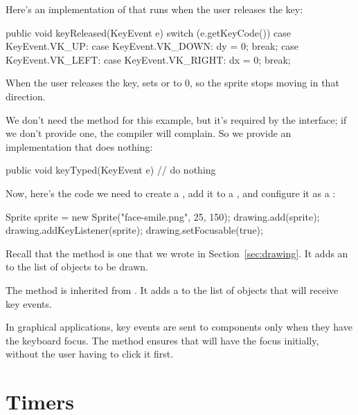 Here's an implementation of  that runs when the user releases the key:

\begin{code}
public void keyReleased(KeyEvent e) {
    switch (e.getKeyCode()) {
        case KeyEvent.VK_UP:
        case KeyEvent.VK_DOWN:
            dy = 0;
            break;
        case KeyEvent.VK_LEFT:
        case KeyEvent.VK_RIGHT:
            dx = 0;
            break;
    }
}
\end{code}

When the user releases the key,  sets  or  to 0, so the sprite stops moving in that direction.

We don't need the  method for this example, but it's required by the interface; if we don't provide one, the compiler will complain.
So we provide an implementation that does nothing:

\begin{code}
public void keyTyped(KeyEvent e) {
    // do nothing
}
\end{code}

Now, here's the code we need to create a , add it to a , and configure it as a :

\begin{code}
Sprite sprite = new Sprite("face-smile.png", 25, 150);
drawing.add(sprite);
drawing.addKeyListener(sprite);
drawing.setFocusable(true);
\end{code}

Recall that the  method is one that we wrote in Section~\ref{sec:drawing}.
It adds an  to the list of objects to be drawn.

The  method is inherited from .
It adds a  to the list of objects that will receive key events.

In graphical applications, key events are sent to components only when they have the keyboard focus.
The  method ensures that  will have the focus initially, without the user having to click it first.


\section{Timers}


